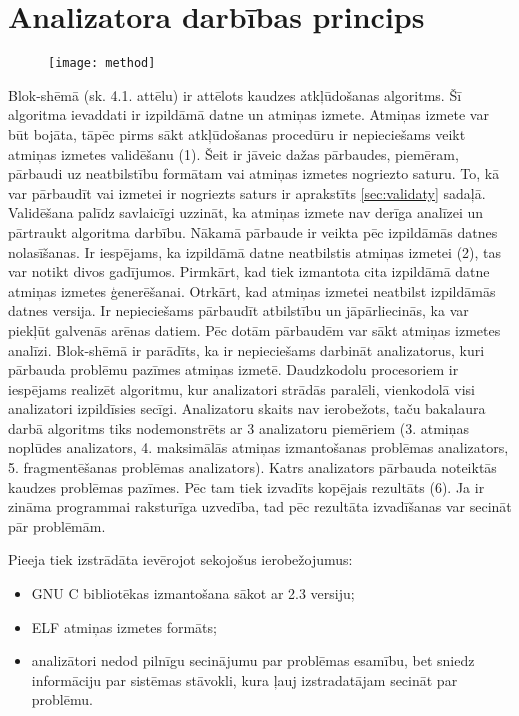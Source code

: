 ﻿\section{Analizatora darbības princips}

 \begin{figure}[h]
\begin{center}
\texttt{[image: method]}
\end{center}
\caption{\textbf{\fontsize{11}{12}\selectfont {Uz metodi balstītā algoritma blok-shēma}}}
\end{figure}

Blok-shēmā (sk. 4.1. attēlu) ir attēlots kaudzes atkļūdošanas algoritms.
Šī algoritma ievaddati ir izpildāmā datne un atmiņas izmete.
Atmiņas izmete var būt bojāta, tāpēc pirms sākt atkļūdošanas procedūru ir nepieciešams veikt atmiņas izmetes validēšanu (1).
Šeit ir jāveic dažas pārbaudes, piemēram, pārbaudi uz neatbilstību formātam vai atmiņas izmetes nogriezto saturu.
To, kā var pārbaudīt vai izmetei ir nogriezts saturs ir aprakstīts \ref{sec:validaty} sadaļā.
Validēšana palīdz savlaicīgi uzzināt, ka atmiņas izmete nav derīga analīzei un pārtraukt algoritma darbību.
Nākamā pārbaude ir veikta pēc izpildāmās datnes nolasīšanas.
Ir iespējams, ka izpildāmā datne neatbilstis atmiņas izmetei (2), tas var notikt divos gadījumos.
Pirmkārt, kad tiek izmantota cita izpildāmā datne atmiņas izmetes ģenerēšanai.
Otrkārt, kad atmiņas izmetei neatbilst izpildāmās datnes versija.
Ir nepieciešams pārbaudīt atbilstību un jāpārliecinās, ka var piekļūt galvenās arēnas datiem.
Pēc dotām pārbaudēm var sākt atmiņas izmetes analīzi.
Blok-shēmā ir parādīts, ka ir nepieciešams darbināt analizatorus, kuri  pārbauda problēmu pazīmes atmiņas izmetē.
Daudzkodolu procesoriem ir iespējams realizēt algoritmu, kur analizatori strādās paralēli, vienkodolā visi analizatori izpildīsies secīgi.
Analizatoru skaits nav ierobežots, taču bakalaura darbā algoritms tiks nodemonstrēts ar 3 analizatoru piemēriem (3. atmiņas noplūdes analizators, 4. maksimālās atmiņas izmantošanas problēmas analizators, 5. fragmentēšanas problēmas analizators).
Katrs analizators pārbauda noteiktās kaudzes problēmas pazīmes.
Pēc tam tiek izvadīts kopējais rezultāts (6).
Ja ir zināma programmai raksturīga uzvedība, tad pēc rezultāta izvadīšanas var secināt pār problēmām.

Pieeja tiek izstrādāta ievērojot sekojošus ierobežojumus: %
\begin{itemize}
	\item GNU C bibliotēkas izmantošana sākot ar 2.3 versiju;
    \item ELF atmiņas izmetes formāts;
    \item analizātori nedod pilnīgu secinājumu par problēmas esamību, bet sniedz informāciju par sistēmas stāvokli, kura ļauj izstradatājam secināt par problēmu.
\end{itemize}



